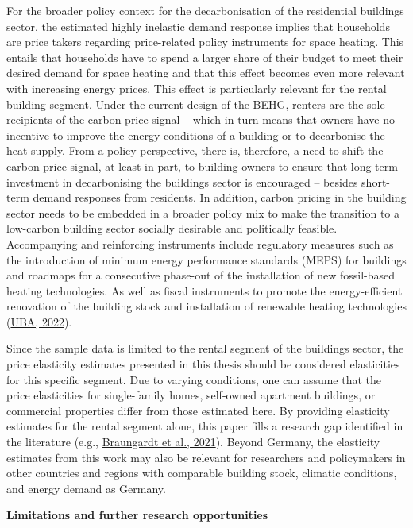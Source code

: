 \documentclass[12pt,twoside]{reedthesis}
\begin{document}
For the broader policy context for the decarbonisation of the residential buildings sector, the estimated highly inelastic demand response implies that households are price takers regarding price-related policy instruments for space heating. This entails that households have to spend a larger share of their budget to meet their desired demand for space heating and that this effect becomes even more relevant with increasing energy prices. This effect is particularly relevant for the rental building segment. Under the current design of the BEHG, renters are the sole recipients of the carbon price signal -- which in turn means that owners have no incentive to improve the energy conditions of a building or to decarbonise the heat supply. From a policy perspective, there is, therefore, a need to shift the carbon price signal, at least in part, to building owners to ensure that long-term investment in decarbonising the buildings sector is encouraged -- besides short-term demand responses from residents. In addition, carbon pricing in the building sector needs to be embedded in a broader policy mix to make the transition to a low-carbon building sector socially desirable and politically feasible. Accompanying and reinforcing instruments include regulatory measures such as the introduction of minimum energy performance standards (MEPS) for buildings and roadmaps for a consecutive phase-out of the installation of new fossil-based heating technologies. As well as fiscal instruments to promote the energy-efficient renovation of the building stock and installation of renewable heating technologies (\protect\hyperlink{ref-uba22}{UBA, 2022}).

Since the sample data is limited to the rental segment of the buildings sector, the price elasticity estimates presented in this thesis should be considered elasticities for this specific segment. Due to varying conditions, one can assume that the price elasticities for single-family homes, self-owned apartment buildings, or commercial properties differ from those estimated here. By providing elasticity estimates for the rental segment alone, this paper fills a research gap identified in the literature (e.g., \protect\hyperlink{ref-braungardt_etal21}{Braungardt et al., 2021}). Beyond Germany, the elasticity estimates from this work may also be relevant for researchers and policymakers in other countries and regions with comparable building stock, climatic conditions, and energy demand as Germany.

\textbf{Limitations and further research opportunities}
\end{document}
